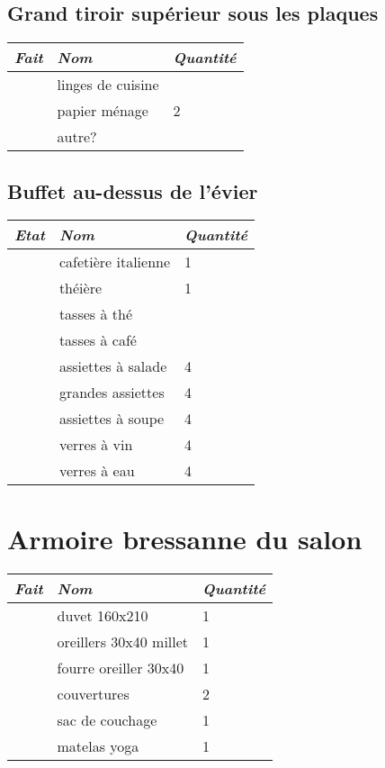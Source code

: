 \documentclass[french]{article}
\begin{document}
\subsection{Grand tiroir supérieur sous les plaques}

\begin{tabular}{|l|l|l|}
	\hline
	\emph{Fait} & \emph{Nom} & \emph{Quantit\'e} \\
	\hline
	& linges de cuisine & \\ \hline
	& papier ménage     & 2 \\ \hline
	& autre?  &  \\ \hline
\end{tabular}	

\subsection{Buffet au-dessus de l'évier}

\begin{tabular}{|l|l|l|}
	\hline
	\emph{Etat} & \emph{Nom} & \emph{Quantit\'e} \\
	\hline
	& cafetière italienne & 1 \\ \hline
	& théière             & 1 \\ \hline
	& tasses à thé        &  \\ \hline
	& tasses à café        &  \\ \hline
	& assiettes à salade   & 4 \\ \hline
	& grandes assiettes    & 4 \\ \hline
	& assiettes à soupe    & 4 \\ \hline
	& verres à vin         & 4 \\ \hline
	& verres à eau         & 4 \\ \hline
\end{tabular}

\section{Armoire bressanne du salon}

\begin{tabular}{|l|l|l|}
	\hline
	\emph{Fait} & \emph{Nom} & \emph{Quantit\'e} \\
	\hline
	& duvet 160x210 &  1\\ \hline	
	& oreillers 30x40 millet & 1 \\ \hline
	& fourre oreiller 30x40  & 1 \\ \hline
	& couvertures & 2 \\ \hline
	& sac de couchage & 1 \\ \hline
	& matelas yoga    & 1 \\ \hline
\end{tabular}
\end{document}

